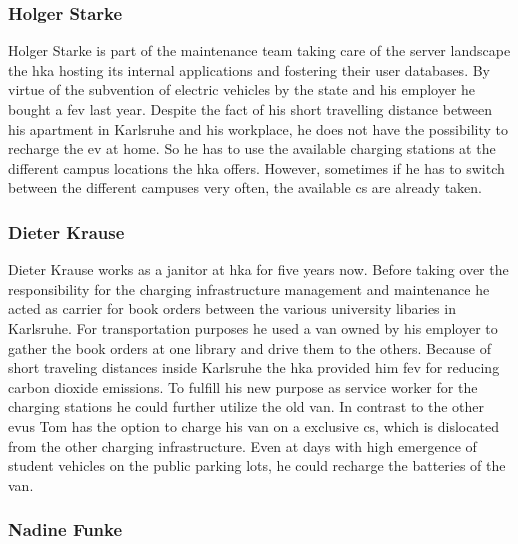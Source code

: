 \subsubsection{Holger Starke}
\label{ch:Requirements Engineering and Process Design:sec:Scenario:ssec:Personas:sssec:Holger Starke}

Holger Starke is part of the maintenance team taking care of the server landscape the \acrshort{hka} hosting its internal applications and fostering their user databases. By virtue of the subvention of electric vehicles by the state and his employer he bought a \acrshort{fev} last year. Despite the fact of his short travelling distance between his apartment in Karlsruhe and his workplace, he does not have the possibility to recharge the \acrshort{ev} at home. So he has to use the available charging stations at the different campus locations the \acrshort{hka} offers. However, sometimes if he has to switch between the different campuses very often, the available \acrshort{cs} are already taken.

\subsubsection{Dieter Krause}
\label{ch:Requirements Engineering and Process Design:sec:Scenario:ssec:Personas:sssec:Tom Krause}

Dieter Krause works as a janitor at \acrshort{hka} for five years now. Before taking over the responsibility for the charging infrastructure management and maintenance he acted as carrier for book orders between the various university libaries in Karlsruhe. For transportation purposes he used a van owned by his employer to gather the book orders at one library and drive them to the others. Because of short traveling distances inside Karlsruhe the \acrshort{hka} provided him \acrshort{fev} for reducing carbon dioxide emissions. To fulfill his new purpose as service worker for the charging stations he could further utilize the old van. In contrast to the other \acrshort{evu}s Tom has the option to charge his van on a exclusive \acrshort{cs}, which is dislocated from the other charging infrastructure. Even at days with high emergence of student vehicles on the public parking lots, he could recharge the batteries of the van. 

\subsubsection{Nadine Funke}
\label{ch:Requirements Engineering and Process Design:sec:Scenario:ssec:Personas:sssec:Nadine Funke}

